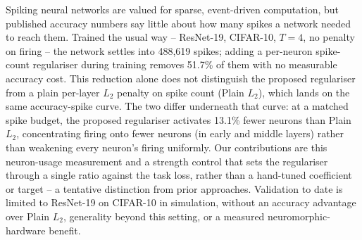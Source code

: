 Spiking neural networks are valued for sparse, event-driven computation, but
published accuracy numbers say little about how many spikes a network
needed to reach them. Trained the usual way -- ResNet-19, CIFAR-10, $T{=}4$, no penalty on
firing -- the network settles into 488,619 spikes; adding a per-neuron
spike-count regulariser during training removes 51.7\% of them with no
measurable accuracy cost. This reduction alone does not distinguish the
proposed regulariser from a plain per-layer $L_2$ penalty on spike count
(Plain $L_2$), which lands on the same accuracy-spike curve. The two differ
underneath that curve: at a matched spike budget, the proposed regulariser
activates 13.1\% fewer neurons than Plain $L_2$, concentrating firing onto fewer neurons
(in early and middle layers) rather than weakening every neuron's firing uniformly. Our contributions are this
neuron-usage measurement and a strength control that sets the
regulariser through a single ratio against the task loss, rather than a
hand-tuned coefficient or target -- a tentative distinction from prior approaches. Validation to date is limited to
ResNet-19 on CIFAR-10 in simulation, without an accuracy advantage over
Plain $L_2$, generality beyond this setting, or a measured
neuromorphic-hardware benefit.
